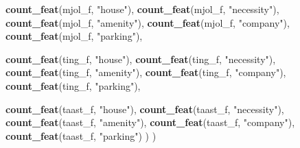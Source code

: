\documentclass[
]{article}
\newenvironment{Shaded}{\begin{snugshade}}{\end{snugshade}}
\newcommand{\FunctionTok}[1]{\textcolor[rgb]{0.13,0.29,0.53}{\textbf{#1}}}
\newcommand{\NormalTok}[1]{#1}
\newcommand{\StringTok}[1]{\textcolor[rgb]{0.31,0.60,0.02}{#1}}
\begin{document}
\begin{Shaded}
\begin{Highlighting}[]
    \FunctionTok{count\_feat}\NormalTok{(mjol\_f,  }\StringTok{"house"}\NormalTok{),   }\FunctionTok{count\_feat}\NormalTok{(mjol\_f,  }\StringTok{"necessity"}\NormalTok{),}
    \FunctionTok{count\_feat}\NormalTok{(mjol\_f,  }\StringTok{"amenity"}\NormalTok{), }\FunctionTok{count\_feat}\NormalTok{(mjol\_f,  }\StringTok{"company"}\NormalTok{),}
    \FunctionTok{count\_feat}\NormalTok{(mjol\_f,  }\StringTok{"parking"}\NormalTok{),}

    \FunctionTok{count\_feat}\NormalTok{(ting\_f,  }\StringTok{"house"}\NormalTok{),   }\FunctionTok{count\_feat}\NormalTok{(ting\_f,  }\StringTok{"necessity"}\NormalTok{),}
    \FunctionTok{count\_feat}\NormalTok{(ting\_f,  }\StringTok{"amenity"}\NormalTok{), }\FunctionTok{count\_feat}\NormalTok{(ting\_f,  }\StringTok{"company"}\NormalTok{),}
    \FunctionTok{count\_feat}\NormalTok{(ting\_f,  }\StringTok{"parking"}\NormalTok{),}

    \FunctionTok{count\_feat}\NormalTok{(taast\_f, }\StringTok{"house"}\NormalTok{),   }\FunctionTok{count\_feat}\NormalTok{(taast\_f, }\StringTok{"necessity"}\NormalTok{),}
    \FunctionTok{count\_feat}\NormalTok{(taast\_f, }\StringTok{"amenity"}\NormalTok{), }\FunctionTok{count\_feat}\NormalTok{(taast\_f, }\StringTok{"company"}\NormalTok{),}
    \FunctionTok{count\_feat}\NormalTok{(taast\_f, }\StringTok{"parking"}\NormalTok{)}
\NormalTok{  )}
\NormalTok{)}


\end{Highlighting}
\end{Shaded}
\end{document}
